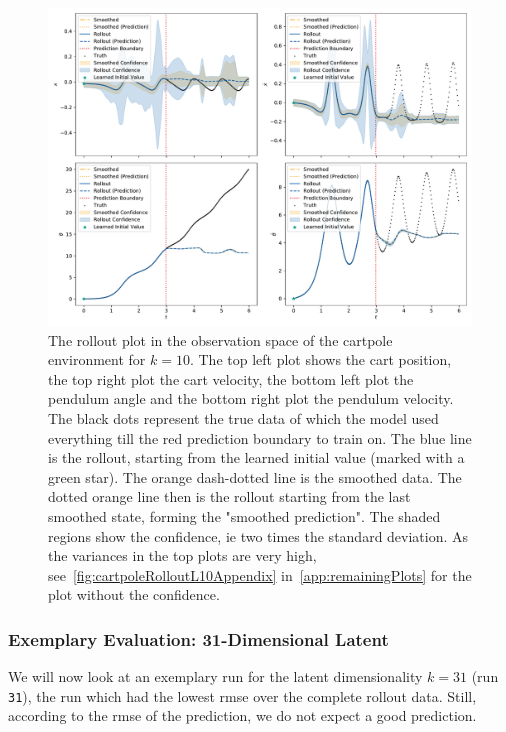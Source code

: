 			\begin{figure}
				\centering
				\includegraphics[width=\linewidth]{figures/results/cartpole-gym/run-latent-dim-10/rollout-observations-N0.pdf}
				\caption{The rollout plot in the observation space of the cartpole environment for \(k = 10\). The top left plot shows the cart position, the top right plot the cart velocity, the bottom left plot the pendulum angle and the bottom right plot the pendulum velocity. The black dots represent the true data of which the model used everything till the red prediction boundary to train on. The blue line is the rollout, starting from the learned initial value (marked with a green star). The orange dash-dotted line is the smoothed data. The dotted orange line then is the rollout starting from the last smoothed state, forming the "smoothed prediction". The shaded regions show the confidence, \ac{ie} two times the standard deviation. As the variances in the top plots are very high, see~\autoref{fig:cartpoleRolloutL10Appendix} in~\autoref{app:remainingPlots} for the plot without the confidence.}
				\label{fig:cartpoleRolloutL10}
			\end{figure}

		\subsubsection{Exemplary Evaluation: 31-Dimensional Latent}
			We will now look at an exemplary run for the latent dimensionality \( k = 31 \) (run \texttt{31}), the run which had the lowest \ac{rmse} over the complete rollout data. Still, according to the \ac{rmse} of the prediction, we do not expect a good prediction.

